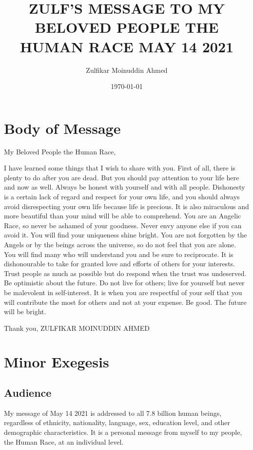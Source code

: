 \documentclass{amsart}
\title{ZULF'S MESSAGE TO MY BELOVED PEOPLE THE HUMAN RACE MAY 14 2021}
\author{Zulfikar Moinuddin Ahmed}
\date{\today}
\begin{document}
\maketitle

\section{Body of Message}

My Beloved People the Human Race,

I have learned some things that I wish to share with you.  First of all, there is plenty to do after you are dead.  But you should pay attention to your life here and now as well.  Always be honest with yourself and with all people.  Dishonesty is a certain lack of regard and respect for your own life, and you should always avoid disrespecting your own life because life is precious.  It is also miraculous and more beautiful than your mind will be able to comprehend.  You are an Angelic Race, so never be ashamed of your goodness.  Never envy anyone else if you can avoid it.  You will find your uniqueness shine bright.  You are not forgotten by the Angels or by the beings across the universe, so do not feel that you are alone.  You will find many who will understand you and be sure to reciprocate.  It is dishonourable to take for granted love and efforts of others for your interests.  Trust people as much as possible but do respond when the trust was undeserved.  Be optimistic about the future.   Do not live for others; live for yourself but never be malevolent in self-interest.  It is when you are respectful of your self that you will contribute the most for others and not at your expense.  Be good.  The future will be bright.

Thank you,
ZULFIKAR MOINUDDIN AHMED

\section{Minor Exegesis}

\subsection{Audience}
My message of May 14 2021 is addressed to all 7.8 billion human beings, regardless of ethnicity, nationality, language, sex, education level, and other demographic characteristics.  It is a personal message from myself to my people, the Human Race, at an individual level.
\end{document}
